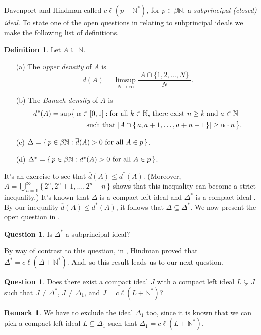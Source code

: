 \documentclass[12pt]{article}
\theoremstyle{plain}
\theoremstyle{definition}
\newtheorem{defn}[thm]{Definition}
\newtheorem{rmk}[thm]{Remark}
\newtheorem{ques}[thm]{Question}
\newcommand{\bbN}{\mathbb{N}}
\begin{document}
Davenport and Hindman called $c\ell(p+\bbN^*)$, for $p \in \beta\bbN$,
a \textsl{subprincipal (closed) ideal}.
To state one of the open questions in \cite{Davenport:1987uq} relating
to subprincipal ideals we make the following list of definitions.
\begin{defn}
  Let $A \subseteq \bbN$.
  \begin{itemize}
    \item[(a)] The \textsl{upper density} of $A$ is 
      \[
        \overline{d}(A) = \limsup_{N\to\infty} \frac{|A \cap \{1, 2,
          \ldots, N\}|}{N}.
      \]
    \item[(b)] The \textsl{Banach density} of $A$ is 
      \begin{align*}
        d^*(A) &= \sup\bigl\{\, \alpha \in [0,1] : \hbox{for all $k \in
          \bbN$, there exist $n \ge k$ and $a \in \bbN$} \\
        &\hspace{5em}\hbox{such that $|A \cap \{\,a, a+1, \ldots,
          a+n-1\,\}| \ge \alpha\cdot n$} \,\bigr\}.
      \end{align*}

    \item[(c)] $\Delta = \{\, p \in \beta\bbN : \hbox{$\overline{d}(A)
        > 0$ for all $A \in p$} \,\}$.

    \item[(d)] $\Delta^* = \{\, p \in \beta\bbN : \hbox{$d^*(A) > 0$
        for all $A \in p$} \,\}$.
  \end{itemize}
\end{defn}
It's an exercise to see that $\overline{d}(A) \le d^*(A)$.
(Moreover, $A = \bigcup_{n=1}^\infty \{\,2^n, 2^n +1, \ldots, 2^n+n
\,\}$ shows that this inequality can become a strict inequality.)
It's known that $\Delta$ is a compact left ideal \cite[Theorem
6.79]{Hindman:1998fk} and $\Delta^*$ is a compact ideal \cite[Theorem
20.5]{Hindman:1998fk}.
By our inequality $\overline{d}(A) \le d^*(A)$, it follows that
$\Delta \subseteq \Delta^*$.
We now present the open question in \cite{Davenport:1987uq}.
\begin{ques}
  Is $\Delta^*$ a subprincipal ideal?
\end{ques}

By way of contrast to this question, in \cite[Lemma
3.4]{Hindman:1988kx}, Hindman proved that $\Delta^* = c\ell(\Delta +
\bbN^*)$.  
And, so this result leads us to our next question.
\begin{ques}
  Does there exist a compact ideal $J$ with a compact left ideal $L
  \subsetneq J$ such that $J \ne \Delta^*$, $J \ne \Delta_1$, and $J =
  c\ell(L + \bbN^*)$?
\end{ques}
\begin{rmk}
  We have to exclude the ideal $\Delta_1$ too, since it is known that
  we can pick a compact left ideal $L \subsetneq \Delta_1$ such that
  $\Delta_1 = c\ell(L + \bbN^*)$.
\end{rmk}
\end{document}
